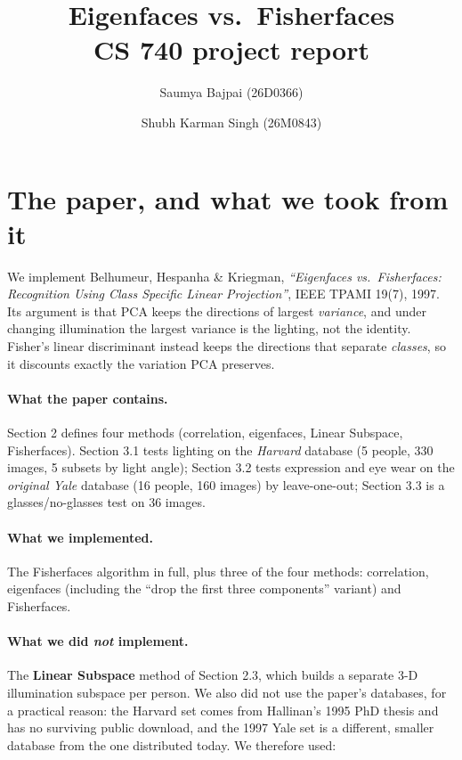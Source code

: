 \documentclass[11pt]{article}
\title{\vspace{-1.2cm}\textbf{Eigenfaces vs.\ Fisherfaces}\\[2pt]
\large CS 740 project report}
\author{Saumya Bajpai (26D0366) \and Shubh Karman Singh (26M0843)}
\date{}
\begin{document}
\maketitle
\vspace{-1.0cm}

\section{The paper, and what we took from it}

We implement Belhumeur, Hespanha \& Kriegman, \emph{``Eigenfaces vs.\
Fisherfaces: Recognition Using Class Specific Linear Projection''}, IEEE TPAMI
19(7), 1997. Its argument is that PCA keeps the directions of largest
\emph{variance}, and under changing illumination the largest variance is the
lighting, not the identity. Fisher's linear discriminant instead keeps the
directions that separate \emph{classes}, so it discounts exactly the variation
PCA preserves.

\paragraph{What the paper contains.} Section 2 defines four methods
(correlation, eigenfaces, Linear Subspace, Fisherfaces). Section 3.1 tests
lighting on the \emph{Harvard} database (5 people, 330 images, 5 subsets by
light angle); Section 3.2 tests expression and eye wear on the \emph{original
Yale} database (16 people, 160 images) by leave-one-out; Section 3.3 is a
glasses/no-glasses test on 36 images.

\paragraph{What we implemented.} The Fisherfaces algorithm in full, plus three
of the four methods: correlation, eigenfaces (including the ``drop the first
three components'' variant) and Fisherfaces.

\paragraph{What we did \emph{not} implement.} The \textbf{Linear Subspace}
method of Section 2.3, which builds a separate 3-D illumination subspace per
person. We also did not use the paper's databases, for a practical reason: the
Harvard set comes from Hallinan's 1995 PhD thesis and has no surviving public
download, and the 1997 Yale set is a different, smaller database from the one
distributed today. We therefore used:
\end{document}
